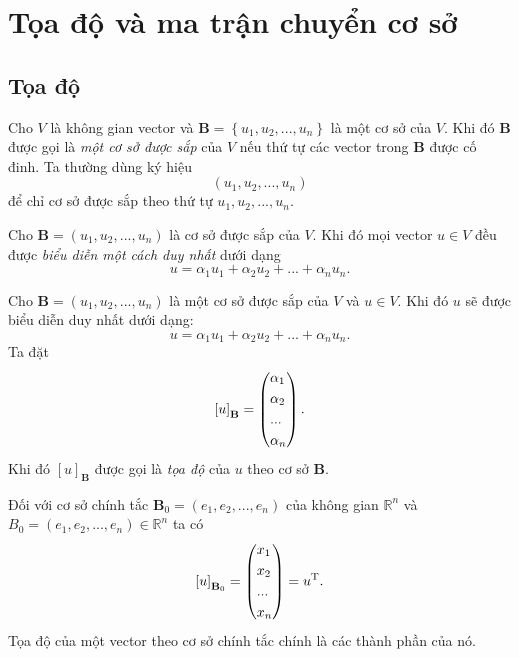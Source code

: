\section{Tọa độ và ma trận chuyển cơ sở}
\subsection{Tọa độ}
Cho $V$ là không gian vector và $\mathbf{B} = \left\{ {{u_1},{u_2},...,{u_n}} \right\}$ là một cơ sở của $V.$ Khi đó $\mathbf{B}$ được gọi là \textit{một cơ sở được sắp} của $V$ nếu thứ tự các vector trong $\mathbf{B}$ được cố đinh. Ta thường dùng ký hiệu
$$\left( {{u_1},{u_2},...,{u_n}} \right)$$
để chỉ cơ sở được sắp theo thứ tự ${{u_1},{u_2},...,{u_n}}.$
\begin{mybox}
Cho $\mathbf{B} = \left( {{u_1},{u_2},...,{u_n}} \right)$ là cơ sở được sắp của $V.$ Khi đó mọi vector $u \in V$ đều được\textit{ biểu diễn một cách duy nhất} dưới dạng
$$u = {\alpha _1}{u_1} + {\alpha _2}{u_2} + ... + {\alpha _n}{u_n}.$$
\end{mybox}
Cho $\mathbf{B} = \left( {{u_1},{u_2},...,{u_n}} \right)$ là một cơ sở được sắp của $V$ và $u \in V.$ Khi đó $u$ sẽ được biểu diễn duy nhất dưới dạng:
$$u = {\alpha _1}{u_1} + {\alpha _2}{u_2} + ... + {\alpha _n}{u_n}.$$
Ta đặt $${\left[ u \right]_{\mathbf{B}}} = \left( \begin{gathered}
  {\alpha _1} \hfill \\
  {\alpha _2} \hfill \\
  ... \hfill \\
  {\alpha _n} \hfill \\ 
\end{gathered}  \right).$$ 
Khi đó ${\left[ u \right]_{\mathbf{B}}}$ được gọi là \textit{tọa độ} của $u$ theo cơ sở $\mathbf{B}.$
\begin{mybox}
Đối với cơ sở chính tắc ${\mathbf{B}_0} = \left( {{e_1},{e_2},...,{e_n}} \right)$ của không gian $\mathbb{R}^n$ và ${B_0} = \left( {{e_1},{e_2},...,{e_n}} \right) \in \mathbb{R}^n $ ta có
$${\left[ u \right]_{{\mathbf{B}_0}}} = \left( \begin{gathered}
  {x_1} \hfill \\
  {x_2} \hfill \\
  ... \hfill \\
  {x_n} \hfill \\ 
\end{gathered}  \right) = {u^\mathrm{T}}.$$
Tọa độ của một vector theo cơ sở chính tắc chính là các thành phần của nó.
\end{mybox}
